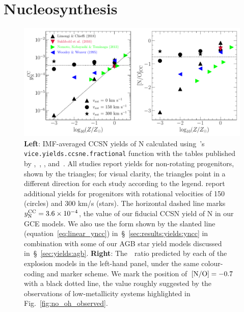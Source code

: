 \documentclass[ms.tex]{subfiles}
\begin{document}
\section{Nucleosynthesis}
\label{sec:yields}

\begin{figure}
\centering
\includegraphics[scale = 0.65]{n_cc_yields.pdf}
\caption{
\textbf{Left}: IMF-averaged CCSN yields of N calculated using~\vice's
\texttt{vice.yields.ccsne.fractional} function with the tables published by
\citet[][blue]{Woosley1995},~\citet[][green]{Nomoto2013},
\citet[][red]{Sukhbold2016}, and~\citet[][black]{Limongi2018}.
All studies report yields for non-rotating progenitors, shown by the triangles;
for visual clarity, the triangles point in a different direction for each study
according to the legend.
\citet{Limongi2018} report additional yields for progenitors with rotational
velocities of 150 (circles) and 300 km/s (stars).
The horizontal dashed line marks~$y_\text{N}^\text{CC} = 3.6\times10^{-4}$,
the value of our fiducial CCSN yield of N in our GCE models.
We also use the form shown by the slanted line (equation~\ref{eq:linear_yncc})
in~\S~\ref{sec:results:yields:yncc} in combination with some of our AGB star
yield models discussed in~\S~\ref{sec:yields:agb}.
\textbf{Right}: The~\no~ratio predicted by each of the explosion models in
the left-hand panel, under the same colour-coding and marker scheme.
We mark the position of~$\text{[N/O]} = -0.7$ with a black dotted line, the value
roughly suggested by the observations of low-metallicity systems highlighted
in Fig.~\ref{fig:no_oh_observed}.
}
\label{fig:n_cc_yields}
\end{figure}
\end{document}
